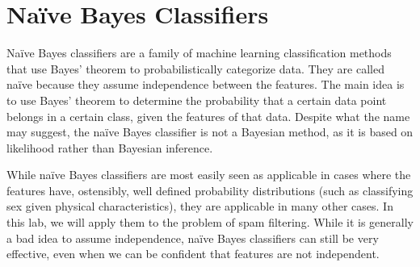 
\section*{Naïve Bayes Classifiers}
Naïve Bayes classifiers are a family of machine learning classification methods that use Bayes' theorem to probabilistically categorize data.
They are called naïve because they assume independence between the features.
The main idea is to use Bayes' theorem to determine the probability that a certain data point belongs in a certain class, given the features of that data.
Despite what the name may suggest, the naïve Bayes classifier is not a Bayesian method, as it is based on likelihood rather than Bayesian inference.

While naïve Bayes classifiers are most easily seen as applicable in cases where the features have, ostensibly, well defined probability distributions (such as classifying sex given physical characteristics), they are applicable in many other cases.
In this lab, we will apply them to the problem of spam filtering.
While it is generally a bad idea to assume independence, naïve Bayes classifiers can still be very effective, even when we can be confident that features are not independent.

